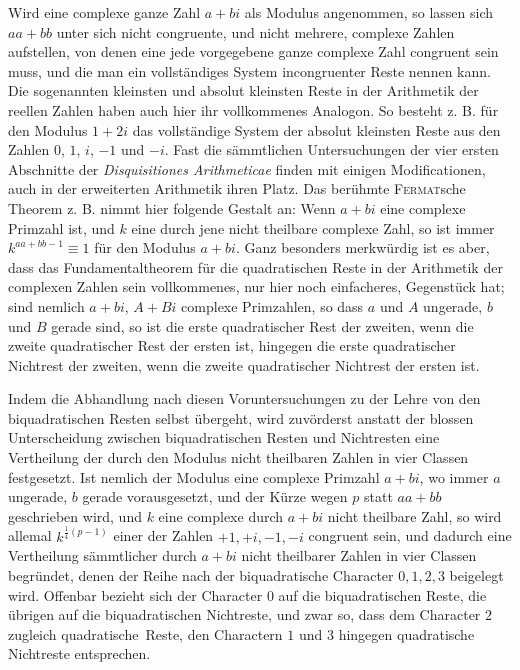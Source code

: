 Wird eine complexe ganze Zahl $a+bi$ als Modulus angenommen, so lassen sich $aa+bb$ unter sich nicht congruente, und nicht mehrere, complexe Zahlen aufstellen, von denen eine jede vorgegebene ganze complexe Zahl congruent sein muss, und die man ein vollständiges System incongruenter Reste nennen kann. Die sogenannten kleinsten und absolut kleinsten Reste in der Arithmetik der reellen Zahlen haben auch hier ihr vollkommenes Analogon. So besteht z. B. für den Modulus $1+2i$ das vollständige System der absolut kleinsten Reste aus den Zahlen $0$, $1$, $i$, $-1$ und $-i$. Fast die sämmtlichen Untersuchungen der vier ersten Abschnitte der \emph{Disquisitiones Arithmeticae} finden mit einigen Modificationen, auch in der erweiterten Arithmetik ihren Platz. Das berühmte \textsc{Fermat}sche Theorem z. B. nimmt hier folgende Gestalt an: Wenn $a+bi$ eine complexe Primzahl ist, und $k$ eine durch jene nicht theilbare complexe Zahl, so ist immer $k^{aa+bb-1}\equiv1$ für den Modulus $a+bi$. Ganz besonders merkwürdig ist es aber, dass das Fundamentaltheorem für die quadratischen Reste in der Arithmetik der complexen Zahlen sein vollkommenes, nur hier noch einfacheres, Gegenstück hat; sind nemlich $a+bi$, $A+Bi$ complexe Primzahlen, so dass $a$ und $A$ ungerade, $b$ und $B$ gerade sind, so ist die erste quadratischer Rest der zweiten, wenn die zweite quadratischer Rest der ersten ist, hingegen die erste quadratischer Nichtrest der zweiten, wenn die zweite quadratischer Nichtrest der ersten ist.

Indem die Abhandlung nach diesen Voruntersuchungen zu der Lehre von den biquadratischen Resten selbst übergeht, wird zuvörderst anstatt der blossen Unterscheidung zwischen biquadratischen Resten und Nichtresten eine Vertheilung der durch den Modulus nicht theilbaren Zahlen in vier Classen festgesetzt. Ist nemlich der Modulus eine complexe Primzahl $a+bi$, wo immer $a$ ungerade, $b$ gerade vorausgesetzt, und der Kürze wegen $p$ statt $aa+bb$ geschrieben wird, und $k$ eine complexe durch $a+bi$ nicht theilbare Zahl, so wird allemal $k^{\frac14(p-1)}$
%
einer der Zahlen $+1,+i,-1,-i$ congruent sein, und dadurch eine Vertheilung sämmtlicher durch $a+bi$ nicht theilbarer Zahlen in vier Classen begründet, denen der Reihe nach der biquadratische Character $0,1,2,3$ beigelegt wird. Offenbar bezieht sich der Character $0$ auf die biquadratischen Reste, die übrigen auf die biquadratischen Nichtreste, und zwar so, dass dem Character $2$ zugleich quadratische\textperiodcentered\ Reste, den Charactern $1$ und $3$ hingegen quadratische Nichtreste entsprechen.

